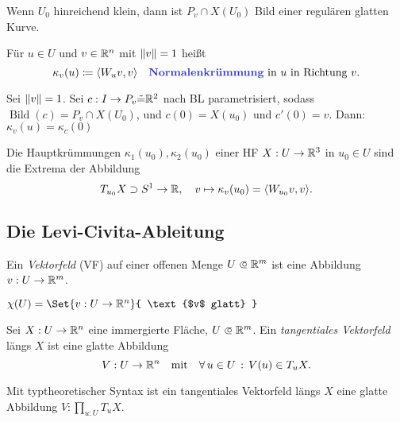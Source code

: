 \documentclass{cheat-sheet}
\DeclareMathOperator{\Bild}{Bild} %
\begin{document}
\begin{satz}
  Wenn $U_0$ hinreichend klein, dann ist $P_v \cap X(U_0)$ Bild einer regulären glatten Kurve.
\end{satz}

\begin{defn}
  Für $u \in U$ und $v \in \mathbb{R}^n$ mit $\lVert v\rVert = 1$ heißt
  \[
    \kappa_v(u) \coloneqq \langle W_u v, v \rangle
    \quad \text{\emph{Normalenkrümmung} in $u$ in Richtung $v$}.
  \]
\end{defn}

\begin{bem}
  Sei $\lVert v\rVert = 1$. Sei $c : I \to P_v \tilde{=} \mathbb{R}^2$ nach BL parametrisiert, sodass $\Bild(c) = P_v \cap X(U_0)$, und $c(0) = X(u_0)$ und $c'(0) = v$. Dann: $\kappa_v(u) = \kappa_c(0)$
\end{bem}

\begin{satz}
  Die Hauptkrümmungen $\kappa_1(u_0), \kappa_2(u_0)$ einer HF $X : U \to \mathbb{R}^3$ in $u_0 \in U$ sind die Extrema der Abbildung
  \[ T_{u_0} X \supset S^1 \to \mathbb{R}, \quad v \mapsto \kappa_v(u_0) = \langle W_{u_0} v, v \rangle. \]
\end{satz}

\begin{samepage}

\subsection{Die Levi-Civita-Ableitung}

\begin{defn}
  Ein \emph{Vektorfeld} (VF) auf einer offenen Menge $U \opn \R^m$ ist eine Abbildung $v : U \to \mathbb{R}^m$.
\end{defn}

\begin{nota}
  $\chi(U) = \Set{ v : U \to \R^n }{ \text{$v$ glatt} }$
\end{nota}

\begin{defn}
  Sei $X : U \to \mathbb{R}^n$ eine immergierte Fläche, $U \opn \R^m$. Ein \emph{tangentiales Vektorfeld} längs $X$ ist eine glatte Abbildung
  \[
    V : U \to \mathbb{R}^n
    \quad \text{mit} \quad
    \forall \, {u \in U} \,:\, V(u) \in T_u X.
  \]
\end{defn}

\begin{bem}
  Mit typtheoretischer Syntax ist ein tangentiales Vektorfeld längs $X$ eine glatte Abbildung $V : \prod_{u : U} T_u X$.
\end{bem}

\end{samepage}
\end{document}
